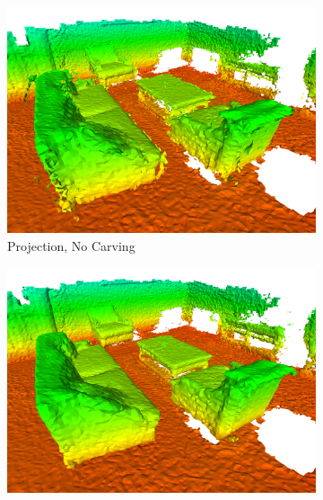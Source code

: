 \documentclass[conference]{IEEEtran}
\begin{document}
 \begin{figure} [htb]\centering
 		\begin{minipage}[b]{1.0\linewidth} \centering
	 		\begin{subfigure}[b]{0.47\textwidth} \centering
	 			\includegraphics[width=1.0\textwidth]{img/fig-apt-proj-nocarv.png}
	 			 \caption{Projection, No Carving}
	 			 \label{fig:proj-nocarv}
	 		\end{subfigure}
	 		\begin{subfigure}[b]{0.47\textwidth} \centering
	 			\includegraphics[width=1.0\textwidth]{img/fig-apt-proj-carv.png}

\end{subfigure}
\end{minipage}
\end{figure}
\end{document}
